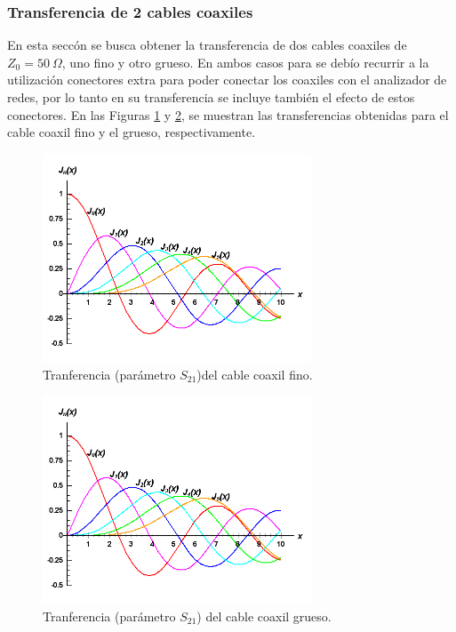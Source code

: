 \documentclass[a4paper,10pt]{article}
\begin{document}
		\subsubsection{Transferencia de 2 cables coaxiles}
		\indent En esta secc\'on se  busca obtener la transferencia de dos 
		cables coaxiles de $Z_0=50~\Omega$, uno fino y otro grueso. En ambos 
		casos para se deb\'io recurrir a la utilizaci\'on conectores extra para 
		poder conectar los coaxiles con el analizador de redes, por lo tanto en 
		su transferencia se incluye tambi\'en el efecto de estos conectores. En 
		las Figuras \ref{caoxilflaco} y \ref{coaxilgordo}, se muestran las 
		transferencias obtenidas para el cable coaxil fino y el grueso, 
		respectivamente.
		
		\begin{figure}[!htb]
			\centering
			\includegraphics[width=8cm]
			{Imagenes/bessel.png}
			\caption{Tranferencia (par\'ametro $S_{21}$)del cable coaxil 
			fino.}
			\label{caoxilflaco} 
		\end{figure}
		
		\begin{figure}[!htb]
			\centering
			\includegraphics[width=8cm]
			{Imagenes/bessel.png}
			\caption{Tranferencia (par\'ametro $S_{21}$) del cable coaxil 
			grueso.}
			\label{coaxilgordo} 
		\end{figure}
\end{document}
